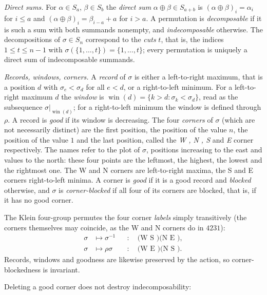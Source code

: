 \documentclass[12pt]{article}
\def\xspace{ }%
\theoremstyle{definition}
\newcommand{\good}{good\xspace}
\newcommand{\cb}{corner-blocked\xspace}
\newcommand{\cbness}{corner-blockedness\xspace}
\newcommand{\goodness}{goodness\xspace}
\newcommand{\wo}{w_0}                 %
\newcommand{\rc}{\rho}                %
\newcommand{\win}{\operatorname{win}}     %
\newcommand{\Wcr}{W\xspace}    %
\newcommand{\Ncr}{N\xspace}    %
\newcommand{\Scr}{S\xspace}    %
\newcommand{\Ecr}{E\xspace}    %
\begin{document}
\emph{Direct sums.} For $\alpha \in S_a$, $\beta \in S_b$ the
\emph{direct sum} $\alpha\oplus\beta \in S_{a+b}$ is
$(\alpha\oplus\beta)_i = \alpha_i$ for $i \le a$ and
$(\alpha\oplus\beta)_i = \beta_{i-a} + a$ for $i > a$. A permutation is
\emph{decomposable} if it is such a sum with both summands nonempty, and
\emph{indecomposable} otherwise. The decompositions of $\sigma \in S_n$
correspond to the \emph{cuts} $t$, that is, the indices $1 \le t \le n-1$ with
$\sigma(\{1,\dots,t\}) = \{1,\dots,t\}$; every permutation is uniquely a
direct sum of indecomposable summands.

\emph{Records, windows, corners.} A \emph{record} of $\sigma$ is either a
left-to-right maximum, that is a position $d$ with $\sigma_e < \sigma_d$
for all $e < d$, or a right-to-left minimum. For a left-to-right maximum
$d$ the \emph{window} is $\win(d) = \{k > d : \sigma_k < \sigma_d\}$, read
as the subsequence $\sigma|_{\win(d)}$; for a right-to-left minimum the
window is defined through $\rc$. A record is \emph{\good} if its window
is decreasing. The four \emph{corners} of $\sigma$ (which are not necessarily distinct) are the first
position, the position of the value $n$, the position of the value $1$
and the last position, called the \emph{\Wcr, \Ncr, \Scr} and \emph{\Ecr}
corner respectively. The names refer to the plot of $\sigma$, positions
increasing to the east and values to the north: these four points are the
leftmost, the highest, the lowest and the rightmost one. The \Wcr and \Ncr
corners are left-to-right maxima, the \Scr and \Ecr corners right-to-left
minima. A corner is \emph{\good} if it is a \good record and
\emph{blocked} otherwise, and $\sigma$ is \emph{\cb} if all four of its
corners are blocked, that is, if it has no \good corner.

The Klein four-group permutes the four corner \emph{labels} simply
transitively (the corners themselves may coincide, as the \Wcr and \Ncr
corners do in $4231$):
\begin{equation}\label{eq:cornersym}
\begin{aligned}
   \sigma &\mapsto \sigma^{-1} &&:\quad \text{(\Wcr \Scr)(\Ncr \Ecr)},\\
   \sigma &\mapsto \rc\sigma   &&:\quad \text{(\Wcr \Ecr)(\Ncr \Scr)} .
\end{aligned}
\end{equation}
Records, windows and \goodness are likewise preserved by the action, so \cbness is invariant.

Deleting a \good corner does not destroy indecomposability:
\end{document}
